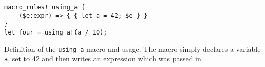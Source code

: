 \begin{listing}
    \begin{verbatim}
macro_rules! using_a {
    ($e:expr) => { { let a = 42; $e } }
}
let four = using_a!(a / 10);
    \end{verbatim}
    \caption{
        Definition of the \texttt{using\_a} macro and usage.
        The macro simply declares a variable \texttt{a},
        set to 42 and then writes an expression which was passed in.
    }
    \label{lst:rust-macro-hygiene:declaration}
\end{listing}